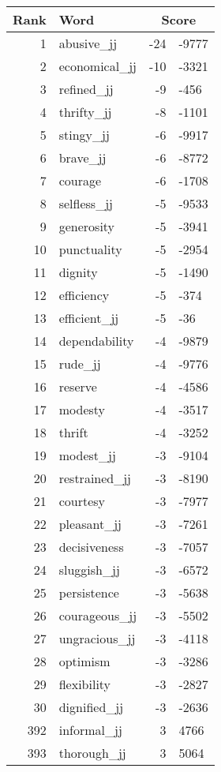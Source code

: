 \begin{longtable}[!htbp]{| rlr@{.}l |}
    \hline
    \textbf{Rank} & \textbf{Word} & \multicolumn{2}{c|}{\textbf{Score}} \\
    \hline
    \endhead
    1 & abusive\_jj & -24 & -9777 \\
    2 & economical\_jj & -10 & -3321 \\
    3 & refined\_jj & -9 & -456 \\
    4 & thrifty\_jj & -8 & -1101 \\
    5 & stingy\_jj & -6 & -9917 \\
    6 & brave\_jj & -6 & -8772 \\
    7 & courage & -6 & -1708 \\
    8 & selfless\_jj & -5 & -9533 \\
    9 & generosity & -5 & -3941 \\
    10 & punctuality & -5 & -2954 \\
    11 & dignity & -5 & -1490 \\
    12 & efficiency & -5 & -374 \\
    13 & efficient\_jj & -5 & -36 \\
    14 & dependability & -4 & -9879 \\
    15 & rude\_jj & -4 & -9776 \\
    16 & reserve & -4 & -4586 \\
    17 & modesty & -4 & -3517 \\
    18 & thrift & -4 & -3252 \\
    19 & modest\_jj & -3 & -9104 \\
    20 & restrained\_jj & -3 & -8190 \\
    21 & courtesy & -3 & -7977 \\
    22 & pleasant\_jj & -3 & -7261 \\
    23 & decisiveness & -3 & -7057 \\
    24 & sluggish\_jj & -3 & -6572 \\
    25 & persistence & -3 & -5638 \\
    26 & courageous\_jj & -3 & -5502 \\
    27 & ungracious\_jj & -3 & -4118 \\
    28 & optimism & -3 & -3286 \\
    29 & flexibility & -3 & -2827 \\
    30 & dignified\_jj & -3 & -2636 \\
    392 & informal\_jj & 3 & 4766 \\
    393 & thorough\_jj & 3 & 5064 \\

\end{longtable}

